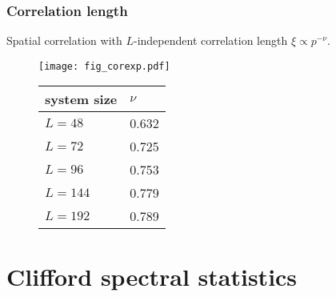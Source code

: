 \documentclass[9pt]{beamer}
\begin{document}
\begin{frame}
\frametitle{Correlation length}


Spatial correlation with $L$-independent correlation length $\xi \propto p^{-\nu}$.
\begin{figure}
\centering
\begin{minipage}{0.55\linewidth}
\texttt{[image: fig\_corexp.pdf]}
\end{minipage}
\hspace{0.5cm}
\begin{minipage}{0.35\linewidth}
\begin{tabular}{l l}
\hline
system size & $\nu$ \\
\hline
$L=48$ 	& 0.632 \\
$L=72$ 	& 0.725 \\
$L=96$ 	& 0.753 \\
$L=144$ & 0.779 \\
$L=192$ & 0.789 \\
\hline
\end{tabular}
\end{minipage}
\end{figure}

\end{frame}





\section{Clifford spectral statistics}
\subsection{}
\end{document}
